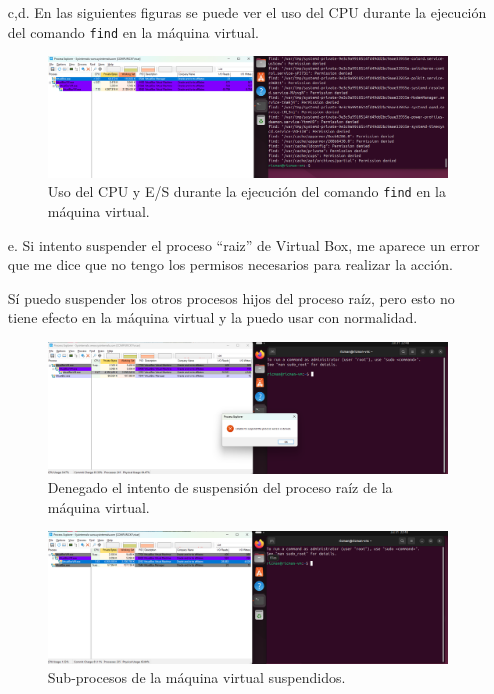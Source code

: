 \documentclass[12pt]{article}
\begin{document}
\begin{enumerate}[1.]
\begin{enumerate}[]
	  \item [c,d.] En las siguientes figuras se puede ver el uso del CPU durante la ejecución del comando \verb|find| en la máquina virtual.
	    \begin{figure}[H]
	      \centering
	      \includegraphics[width=\linewidth]{../imagenes/vm-find.png}
	      \caption{Uso del CPU y E/S durante la ejecución del comando \texttt{find} en la máquina virtual.}
	      \label{vm-find}
	    \end{figure}

	  \item [e.] Si intento suspender el proceso ``raiz'' de Virtual Box, me aparece un error que me dice que no tengo los permisos necesarios para realizar la acción. 

	    Sí puedo suspender los otros procesos hijos del proceso raíz, pero esto no tiene efecto en la máquina virtual y la puedo usar con normalidad.
	    \begin{figure}[H]
	      \centering
	      \includegraphics[width=\linewidth]{../imagenes/suspend-vm-denied.png}
	      \caption{Denegado el intento de suspensión del proceso raíz de la máquina virtual.}
	      \label{}
	    \end{figure}
	    \begin{figure}[H]
	      \centering
	      \includegraphics[width=\linewidth]{../imagenes/suspend-vm.png}
	      \caption{Sub-procesos de la máquina virtual suspendidos.}
	      \label{}
	    \end{figure}
      \end{enumerate}


\end{enumerate}
\end{document}
